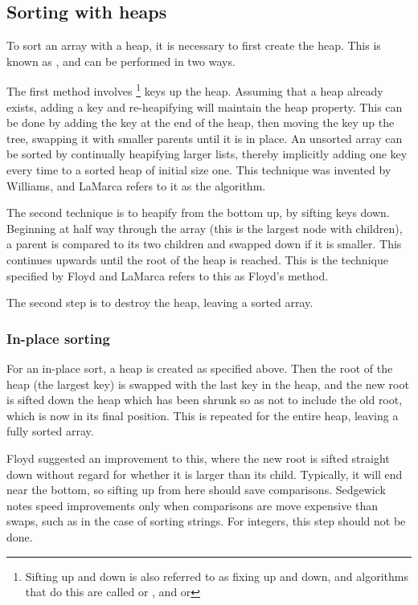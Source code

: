 \subsection{Sorting with heaps}
To sort an array with a heap, it is necessary to first create the heap. This is
known as , and can be performed in two ways.

The first method involves \footnote{Sifting up and down is also
referred to as fixing up and down, and algorithms that do this are called
 or , and  or } keys up the heap.
Assuming that a heap already exists, adding a key and re-heapifying will
maintain the heap property. This can be done by adding the key at the end of
the heap, then moving the key up the tree, swapping it with smaller parents
until it is in place. An unsorted array can be sorted by continually heapifying
larger lists, thereby implicitly adding one key every time to a sorted heap of
initial size one. This technique was invented by Williams, and LaMarca refers to
it as the  algorithm.

The second technique is to heapify from the bottom up, by sifting keys down.
Beginning at half way through the array (this is the largest node with children),
a parent is compared to its two children and swapped down if it is smaller. This
continues upwards until the root of the heap is reached. This is the technique
specified by Floyd and LaMarca refers to this as Floyd's method.

The second step is to destroy the heap, leaving a sorted array.

\subsubsection{In-place sorting}
For an in-place sort, a heap is created as specified above. Then the root of the
heap (the largest key) is swapped with the last key in the heap, and the new
root is sifted down the heap which has been shrunk so as not to include the old
root, which is now in its final position. This is repeated for the entire heap,
leaving a fully sorted array.

Floyd suggested an improvement to this, where the new root is sifted straight
down without regard for whether it is larger than its child. Typically, it will
end near the bottom, so sifting up from here should save comparisons. Sedgewick
notes speed improvements only when comparisons are move expensive than swaps,
such as in the case of sorting strings. For integers, this step should not be
done.

